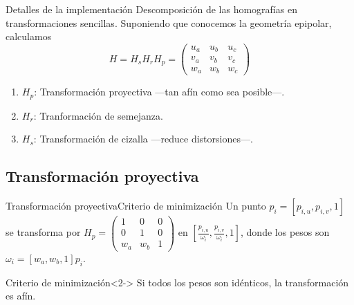 \documentclass[aspectratio=169,14pt,spanish]{beamer}
\begin{document}
    \begin{frame}{Detalles de la implementación}{}
      Descomposición de las homografías en transformaciones sencillas.
      Suponiendo que conocemos la geometría epipolar, calculamos
      \[
      H = H_s H_r H_p =
      \begin{pmatrix}
          u_a & u_b & u_c \\
          v_a & v_b & v_c \\
          w_a & w_b & w_c
      \end{pmatrix}
      \]

        \begin{enumerate}
            \item<2-> $H_p$: Transformación proyectiva ---tan afín como sea posible---.
            \item<3-> $H_r$: Tranformación de semejanza.
            \item<4-> $H_s$: Transformación de cizalla ---reduce distorsiones---.
        \end{enumerate}
    \end{frame}

    \subsection{Transformación proyectiva}


      \begin{frame}{Transformación proyectiva}{Criterio de minimización}
          Un punto $p_i = [p_{i,u}, p_{i,v}, 1]$ se transforma por
          $
          H_p =
          \begin{pmatrix}
              1 & 0 & 0 \\
              0 & 1 & 0 \\
              w_a & w_b & 1
          \end{pmatrix}
          $
          en $[\frac{p_{i,u}}{\omega_i}, \frac{p_{i,v}}{\omega_i}, 1]$, donde los pesos son $\omega_i = [w_a, w_b, 1]p_i$.
          \\
          \begin{alertblock}{Criterio de minimización}<2->
              Si todos los pesos son idénticos, la transformación es afín.
          \end{alertblock}
      \end{frame}
\end{document}
